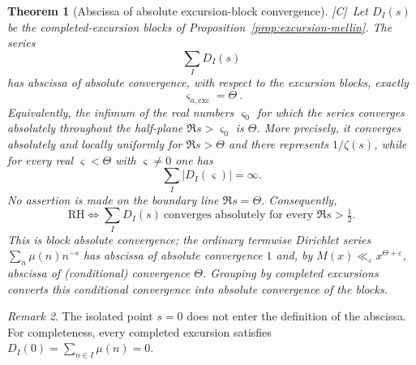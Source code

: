 \documentclass[11pt]{amsart}
\numberwithin{equation}{section}
\theoremstyle{plain}
\newtheorem{theorem}{Theorem}[section]
\theoremstyle{definition}
\theoremstyle{remark}
\newtheorem{remark}[theorem]{Remark}
\newcommand{\eps}{\varepsilon}
\newcommand{\tagC}{\textup{[C]}}
\begin{document}
\begin{theorem}[Abscissa of absolute excursion-block convergence]
\label{thm:excursion-block-abscissa}
\tagC\ Let $D_I(s)$ be the completed-excursion blocks of
Proposition~\ref{prop:excursion-mellin}.  The series
\[
 \sum_I D_I(s)
\]
has abscissa of absolute convergence, with respect to the excursion blocks,
exactly
\[
 \boxed{\ \varsigma_{a,\mathrm{exc}}=\Theta\ }.
\]
Equivalently, the infimum of the real numbers $\varsigma_0$ for which the
series converges absolutely throughout the half-plane
$\Re s>\varsigma_0$ is $\Theta$.  More precisely, it converges absolutely
and locally uniformly for $\Re s>\Theta$ and there represents $1/\zeta(s)$,
while for every real $\varsigma<\Theta$ with $\varsigma\ne0$ one has
\[
 \sum_I|D_I(\varsigma)|=\infty .
\]
No assertion is made on the boundary line $\Re s=\Theta$.
Consequently,
\[
 \mathrm{RH}\iff
 \sum_I D_I(s)\ \text{converges absolutely for every }\Re s>\tfrac12.
\]
This is block absolute convergence; the ordinary termwise Dirichlet series
$\sum_n\mu(n)n^{-s}$ has abscissa of absolute convergence $1$ and, by
$M(x)\ll_\eps x^{\Theta+\eps}$, abscissa of (conditional) convergence
$\Theta$. Grouping by completed excursions converts this conditional
convergence into absolute convergence of the blocks.
\end{theorem}

\begin{remark}
The isolated point $s=0$ does not enter the definition of the abscissa.
For completeness, every completed excursion satisfies
$D_I(0)=\sum_{n\in I}\mu(n)=0$.
\end{remark}
\end{document}
